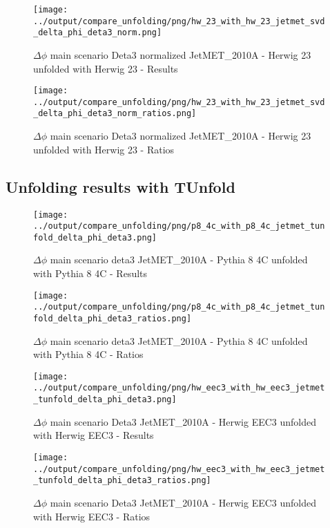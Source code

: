 \documentclass[11pt]{book}
\begin{document}
\begin{figure}[ht]
\centering
\texttt{[image: ../output/compare\_unfolding/png/hw\_23\_with\_hw\_23\_jetmet\_svd\_delta\_phi\_deta3\_norm.png]}
\caption{$\Delta\phi$ main scenario Deta3 normalized JetMET\_2010A - Herwig 23 unfolded with Herwig 23 - Results}
\label{hw_23_hw_23_jetmet_svd_delta_phi_deta3_norm_a}
\end{figure}

\begin{figure}[ht]
\centering
\texttt{[image: ../output/compare\_unfolding/png/hw\_23\_with\_hw\_23\_jetmet\_svd\_delta\_phi\_deta3\_norm\_ratios.png]}
\caption{$\Delta\phi$ main scenario Deta3 normalized JetMET\_2010A - Herwig 23 unfolded with Herwig 23 - Ratios}
\label{hw_23_hw_23_jetmet_svd_delta_phi_deta3_norm_b}
\end{figure}


\clearpage
\subsection{Unfolding results with TUnfold}

\begin{figure}[ht]
\centering
\texttt{[image: ../output/compare\_unfolding/png/p8\_4c\_with\_p8\_4c\_jetmet\_tunfold\_delta\_phi\_deta3.png]}
\caption{$\Delta\phi$ main scenario deta3 JetMET\_2010A - Pythia 8 4C unfolded with Pythia 8 4C - Results}
\label{p8_p8_jetmet_tunfold_delta_phi_deta3_a}
\end{figure}

\begin{figure}[ht]
\centering
\texttt{[image: ../output/compare\_unfolding/png/p8\_4c\_with\_p8\_4c\_jetmet\_tunfold\_delta\_phi\_deta3\_ratios.png]}
\caption{$\Delta\phi$ main scenario deta3 JetMET\_2010A - Pythia 8 4C unfolded with Pythia 8 4C - Ratios}
\label{p8_p8_jetmet_tunfold_delta_phi_deta3_b}
\end{figure}

\begin{figure}[ht]
\centering
\texttt{[image: ../output/compare\_unfolding/png/hw\_eec3\_with\_hw\_eec3\_jetmet\_tunfold\_delta\_phi\_deta3.png]}
\caption{$\Delta\phi$ main scenario Deta3 JetMET\_2010A - Herwig EEC3 unfolded with Herwig EEC3 - Results}
\label{hw_eec3_hw_eec3_jetmet_tunfold_delta_phi_deta3_a}
\end{figure}

\begin{figure}[ht]
\centering
\texttt{[image: ../output/compare\_unfolding/png/hw\_eec3\_with\_hw\_eec3\_jetmet\_tunfold\_delta\_phi\_deta3\_ratios.png]}
\caption{$\Delta\phi$ main scenario Deta3 JetMET\_2010A - Herwig EEC3 unfolded with Herwig EEC3 - Ratios}
\label{hw_eec3_hw_eec3_jetmet_tunfold_delta_phi_deta3_b}
\end{figure}
\end{document}
